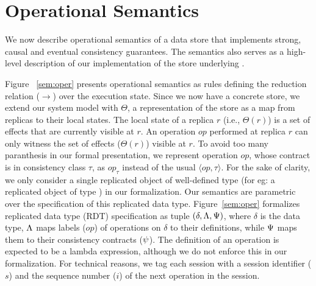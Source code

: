 \section{Operational Semantics}
\label{sec:store-opsem}

\renewcommand{\auxred}[4]{#1 \vdash #2 \;\xhookrightarrow{#3}\; #4 }

We now describe operational semantics of a data store that implements
strong, causal and eventual consistency guarantees. The semantics also
serves as a high-level description of our implementation of the store
underlying \name.



Figure ~\ref{sem:oper} presents operational semantics as rules
defining the reduction relation ($\xrightarrow{}$) over the execution
state.  Since we now have a concrete store, we extend our system model
with $\Theta$, a representation of the store as a map from replicas to
their local states. The local state of a replica $r$ (i.e.,
$\Theta(r)$) is a set of effects that are currently visible at $r$.
An operation $op$ performed at replica $r$ can only witness the set of
effects ($\Theta(r)$) visible at $r$. To avoid too many paranthesis in
our formal presentation, we represent operation $op$, whose contract
is in consistency class $\tau$, as $op_\tau$ instead of the usual
$\langle op,\tau \rangle$. For the sake of clarity, we only
consider a single replicated object of well-defined type (for eg: a
replicated object of type ) in our formalization.  Our
semantics are parametric over the specification of this replicated
data type. Figure~\ref{sem:oper} formalizes replicated data type (RDT)
specification as tuple $(\delta,\Lambda,\Psi)$, where $\delta$ is the
data type, $\Lambda$ maps labels ($op$) of operations on $\delta$ to
their definitions, while $\Psi$ maps them to their consistency
contracts ($\psi$). The definition of an operation is expected to be a
lambda expression, although we do not enforce this in our
formalization. For technical reasons, we tag each session with a
session identifier ($s$) and the sequence number ($i$) of the next
operation in the session.


